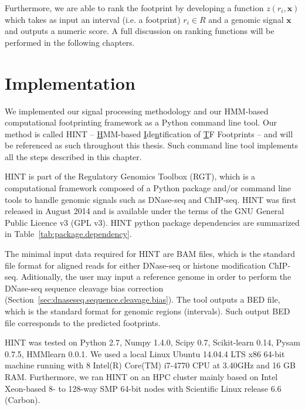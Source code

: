 Furthermore, we are able to rank the footprint by developing a function $z({r}_{i}, \mathbf{x})$ which takes as input an interval (i.e. a footprint) ${r}_{i} \in R$ and a genomic signal $\mathbf{x}$ and outputs a numeric score. A full discussion on ranking functions will be performed in the following chapters.

\section{Implementation}
\label{sec:implementation}

We implemented our signal processing methodology and our HMM-based computational footprinting framework as a Python command line tool. Our method is called HINT -- \underline{H}MM-based \underline{I}de\underline{n}tification of \underline{T}F Footprints -- and will be referenced as such throughout this thesis. Such command line tool implements all the steps described in this chapter.

HINT is part of the Regulatory Genomics Toolbox (RGT), which is a computational framework composed of a Python package and/or command line tools to handle genomic signals such as DNase-seq and ChIP-seq. HINT was first released in August 2014 and is available under the terms of the GNU General Public Licence v3 (GPL v3). HINT python package dependencies are summarized in Table~\ref{tab:package.dependency}.

The minimal input data required for HINT are BAM files, which is the standard file format for aligned reads for either DNase-seq or histone modification ChIP-seq. Aditionally, the user may input a reference genome in order to perform the DNase-seq sequence cleavage bias correction (Section~\ref{sec:dnaseseq.sequence.cleavage.bias}). The tool outputs a BED file, which is the standard format for genomic regions (intervals). Such output BED file corresponds to the predicted footprints.

HINT was tested on Python 2.7, Numpy 1.4.0, Scipy 0.7, Scikit-learn 0.14, Pysam 0.7.5, HMMlearn 0.0.1. We used a local Linux Ubuntu 14.04.4 LTS x86 64-bit machine running with 8 Intel(R) Core(TM) i7-4770 CPU at 3.40GHz and 16 GB RAM. Furthermore, we ran HINT on an HPC cluster mainly based on Intel Xeon-based 8- to 128-way SMP 64-bit nodes with Scientific Linux release 6.6 (Carbon).

